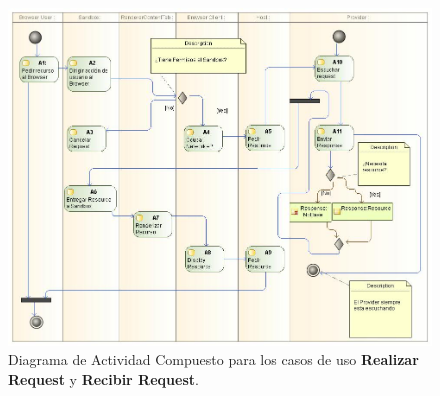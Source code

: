 \begin{landscape}
\begin{figure}[h!t]
    \centering
    \includegraphics[scale=0.52]{figures/chap5/activityDiag_v3.jpg}
    \caption{Diagrama de Actividad Compuesto para los casos de uso \textbf{Realizar Request} y \textbf{Recibir Request}.}
    \label{fig:ActDiagr}
\end{figure}
\end{landscape}

